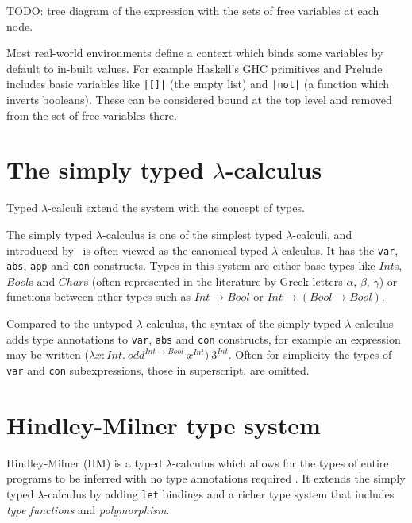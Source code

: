 \documentclass[a4paper,fleqn,oneside,12pt]{report}
\begin{document}
TODO: tree diagram of the expression with the sets of free variables at each node.

Most real-world environments define a context which binds some variables by default to in-built values. For example Haskell’s GHC primitives and Prelude includes basic variables like \texttt{|[]|} (the empty list) and \texttt{|not|} (a function which inverts booleans). These can be considered bound at the top level and removed from the set of free variables there.

\section{The simply typed \texorpdfstring{$\lambda$-}{lambda }calculus}\label{id:h.w7vj0r89b86n}

Typed $\lambda$-calculi extend the system with the concept of types.

The simply typed $\lambda$-calculus is one of the simplest typed $\lambda$-calculi, and introduced by~\cite{ref11} is often viewed as the canonical typed $\lambda$-calculus. It has the \texttt{var}, \texttt{abs}, \texttt{app} and \texttt{con} constructs. Types in this system are either base types like $Int$s, $Bool$s and $Char$s (often represented in the literature by Greek letters $\alpha$, $\beta$, $\gamma$) or functions between other types such as $Int \rightarrow Bool$ or $Int \rightarrow (Bool \rightarrow Bool)$.

Compared to the untyped $\lambda$-calculus, the syntax of the simply typed $\lambda$-calculus adds type annotations to \texttt{var}, \texttt{abs} and \texttt{con} constructs, for example an expression may be written ($\lambda x: Int.\ odd^{Int \rightarrow Bool}\ x^{Int})\ 3^{Int}$. Often for simplicity the types of \texttt{var} and \texttt{con} subexpressions, those in superscript, are omitted.

\section{Hindley-Milner type system}\label{id:h.gsouq2axz3k}

Hindley-Milner (HM) is a typed $\lambda$-calculus which allows for the types of entire programs to be inferred with no type annotations required \citep{ref12,ref13}. It extends the simply typed $\lambda$-calculus by adding \texttt{let} bindings and a richer type system that includes \textit{type functions} and \textit{polymorphism}.
\end{document}
